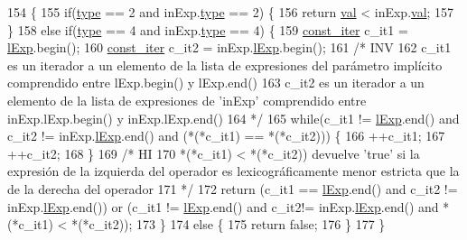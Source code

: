 \begin{DoxyCode}
154 \{
155   \textcolor{keywordflow}{if}(\hyperlink{class_expression_a2c094b93c4863b1f851ea2136aae9612}{type} == 2 and inExp.\hyperlink{class_expression_a2c094b93c4863b1f851ea2136aae9612}{type} == 2) \{
156     \textcolor{keywordflow}{return} \hyperlink{class_expression_a9c15b529b5d59e6bffb3855e384c04aa}{val} < inExp.\hyperlink{class_expression_a9c15b529b5d59e6bffb3855e384c04aa}{val};
157   \}
158   \textcolor{keywordflow}{else} \textcolor{keywordflow}{if}(\hyperlink{class_expression_a2c094b93c4863b1f851ea2136aae9612}{type} == 4 and inExp.\hyperlink{class_expression_a2c094b93c4863b1f851ea2136aae9612}{type} == 4) \{
159     \hyperlink{_expression_8cc_a6ff59711533978050143f1bfb54c33b1}{const\_iter} c\_it1 = \hyperlink{class_expression_afb4f4617291f7e182cbf2252151b122a}{lExp}.begin();
160     \hyperlink{_expression_8cc_a6ff59711533978050143f1bfb54c33b1}{const\_iter} c\_it2 = inExp.\hyperlink{class_expression_afb4f4617291f7e182cbf2252151b122a}{lExp}.begin();
161     \textcolor{comment}{/* INV}
162 \textcolor{comment}{      c\_it1 es un iterador a un elemento de la lista de expresiones del parámetro implícito comprendido
       entre lExp.begin() y lExp.end()}
163 \textcolor{comment}{      c\_it2 es un iterador a un elemento de la lista de expresiones de 'inExp' comprendido entre
       inExp.lExp.begin() y inExp.lExp.end()}
164 \textcolor{comment}{    */}
165     \textcolor{keywordflow}{while}(c\_it1 != \hyperlink{class_expression_afb4f4617291f7e182cbf2252151b122a}{lExp}.end() and c\_it2 != inExp.\hyperlink{class_expression_afb4f4617291f7e182cbf2252151b122a}{lExp}.end() and (*(*c\_it1) == *(*c\_it2))) \{
166       ++c\_it1;
167       ++c\_it2;
168     \}
169     \textcolor{comment}{/* HI}
170 \textcolor{comment}{      *(*c\_it1) < *(*c\_it2)) devuelve 'true' si la expresión de la izquierda del operador es
       lexicográficamente menor estricta que la de la derecha del operador}
171 \textcolor{comment}{    */}
172     \textcolor{keywordflow}{return} (c\_it1 == \hyperlink{class_expression_afb4f4617291f7e182cbf2252151b122a}{lExp}.end() and c\_it2 != inExp.\hyperlink{class_expression_afb4f4617291f7e182cbf2252151b122a}{lExp}.end()) or (c\_it1 != 
      \hyperlink{class_expression_afb4f4617291f7e182cbf2252151b122a}{lExp}.end() and c\_it2!= inExp.\hyperlink{class_expression_afb4f4617291f7e182cbf2252151b122a}{lExp}.end() and *(*c\_it1) < *(*c\_it2));
173   \}
174   \textcolor{keywordflow}{else} \{
175     \textcolor{keywordflow}{return} \textcolor{keyword}{false};
176   \}
177 \}
\end{DoxyCode}
